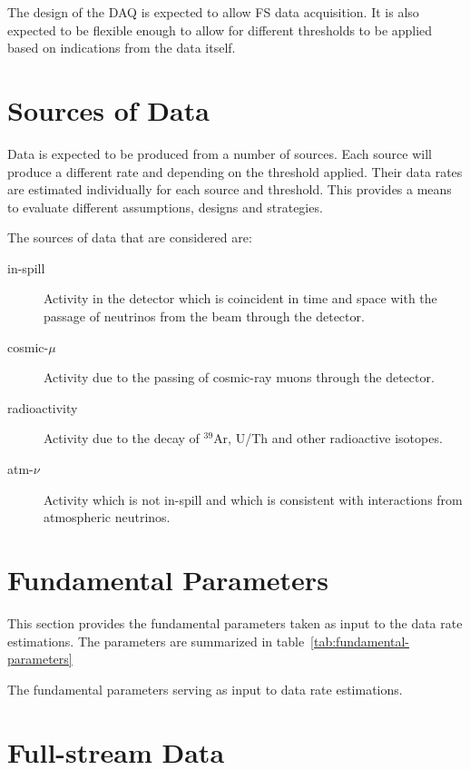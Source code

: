 The design of the DAQ is expected to allow FS data acquisition.
It is also expected to be flexible enough to allow for different
thresholds to be applied based on indications from the data itself.

\section{Sources of Data}

Data is expected to be produced from a number of sources.
Each source will produce a different rate and depending on the
threshold applied.
Their data rates are estimated individually for each source and threshold.
This provides a means to evaluate different assumptions, designs and
strategies.

The sources of data that are considered are:

\begin{description}
\item[in-spill] Activity in the detector which
  is coincident in time and space with the passage of neutrinos from
  the beam through the detector.
\item[cosmic-$\mu$] Activity due to the
  passing of cosmic-ray muons through the detector.
\item[radioactivity] Activity due to the decay of $^{39}$Ar,
  U/Th and other radioactive isotopes.
\item[atm-$\nu$] Activity which is not in-spill and which is
  consistent with interactions from atmospheric neutrinos.
\end{description}

\section{Fundamental Parameters}

This section provides the fundamental parameters taken as input to the
data rate estimations.
The parameters are summarized in
table~\ref{tab:fundamental-parameters}

\begin{table}[htbp]
  \centering
  \caption{The fundamental parameters serving as input to data rate estimations.}
  
  \label{tab:fundamental-parameters}
\end{table}


\section{Full-stream Data}

